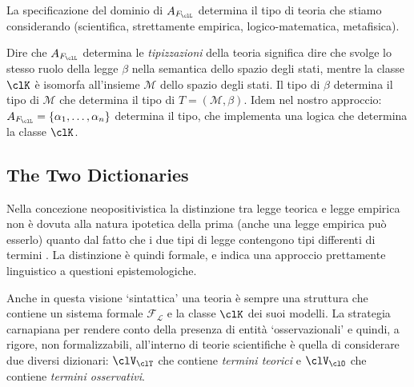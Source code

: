 La specificazione del dominio di $A_{F_\clL}$ determina il tipo di teoria che stiamo considerando (scientifica, strettamente empirica, logico-matematica, metafisica).

Dire che $A_{F_\clL}$ determina le \emph{tipizzazioni} della teoria significa
dire che svolge lo stesso ruolo della legge $\beta$ nella semantica dello spazio degli
stati, mentre la classe $\clK$ è isomorfa all'insieme $\mathcal{M}$ dello spazio
degli stati. Il tipo di $\beta$ determina il tipo di $\mathcal{M}$ che determina il
tipo di $T = (\mathcal{M}, \beta)$. Idem nel nostro approccio: $A_{F_\clL}
	= \{\alpha_1,\dots,\alpha_n\}$ determina il tipo, che implementa una logica che determina
la classe $\clK$.

\subsection{The Two Dictionaries}
Nella concezione neopositivistica la distinzione tra legge teorica e legge empirica non è dovuta alla natura ipotetica della prima (anche una legge empirica può esserlo) quanto dal fatto che i due tipi di legge contengono tipi differenti di termini \cite{?}. La distinzione è quindi formale, e indica una approccio prettamente linguistico a questioni epistemologiche.
\begin{remark}\label{hint_at_collage}
	Anche in questa visione `sintattica' \cite{giunti2016} una teoria è sempre una struttura che contiene un sistema formale $\mathcal{F_L}$ e la classe $\clK$ dei suoi modelli. La strategia carnapiana per rendere conto della presenza di entità `osservazionali' e quindi, a rigore, non formalizzabili, all'interno di teorie scientifiche è quella di considerare due diversi dizionari: $\clV_\clT$ che contiene \emph{termini teorici} e $\clV_\clO$ che contiene \emph{termini osservativi}. 
\end{remark}


